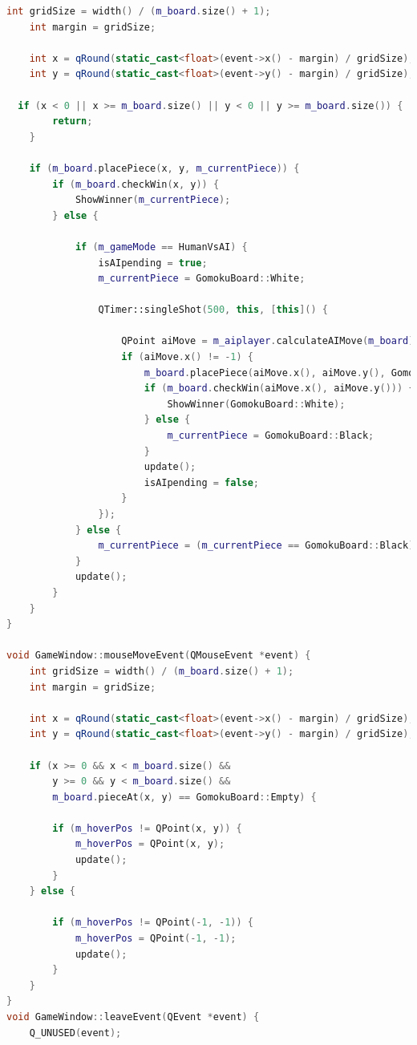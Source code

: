 \documentclass[UTF8]{ctexart}
\begin{document}
\begin{lstlisting}[language=C++]
    int gridSize = width() / (m_board.size() + 1);
    int margin = gridSize;
    
    int x = qRound(static_cast<float>(event->x() - margin) / gridSize);
    int y = qRound(static_cast<float>(event->y() - margin) / gridSize);

  if (x < 0 || x >= m_board.size() || y < 0 || y >= m_board.size()) {
        return;
    }

    if (m_board.placePiece(x, y, m_currentPiece)) {
        if (m_board.checkWin(x, y)) {
            ShowWinner(m_currentPiece);
        } else {

            if (m_gameMode == HumanVsAI) {
				isAIpending = true;
                m_currentPiece = GomokuBoard::White;
				
                QTimer::singleShot(500, this, [this]() { 
					
                    QPoint aiMove = m_aiplayer.calculateAIMove(m_board);
                    if (aiMove.x() != -1) {
                        m_board.placePiece(aiMove.x(), aiMove.y(), GomokuBoard::White);
                        if (m_board.checkWin(aiMove.x(), aiMove.y())) {
                            ShowWinner(GomokuBoard::White);
                        } else {
                            m_currentPiece = GomokuBoard::Black;
                        }
                        update();
                        isAIpending = false;
                    }
                });	
            } else {
                m_currentPiece = (m_currentPiece == GomokuBoard::Black) ? GomokuBoard::White : GomokuBoard::Black;
            }
            update();
        }
    }
}

void GameWindow::mouseMoveEvent(QMouseEvent *event) {
    int gridSize = width() / (m_board.size() + 1);
    int margin = gridSize;

    int x = qRound(static_cast<float>(event->x() - margin) / gridSize);
    int y = qRound(static_cast<float>(event->y() - margin) / gridSize);

    if (x >= 0 && x < m_board.size() && 
        y >= 0 && y < m_board.size() && 
        m_board.pieceAt(x, y) == GomokuBoard::Empty) {

        if (m_hoverPos != QPoint(x, y)) {
            m_hoverPos = QPoint(x, y);
            update(); 
        }
    } else {

        if (m_hoverPos != QPoint(-1, -1)) {
            m_hoverPos = QPoint(-1, -1);
            update();
        }
    }
}
void GameWindow::leaveEvent(QEvent *event) {
    Q_UNUSED(event);


\end{lstlisting}
\end{document}
